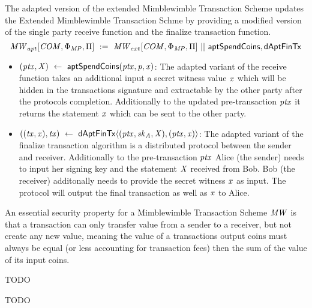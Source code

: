 \begin{definition}
    \label{def:apt-ext-mw-tx-scheme}
    The adapted version of the extended Mimblewimble Transaction Scheme updates the Extended Mimblewimble Transaction Schme by providing a modified version of the single party receive function and the finalize
    transaction function.
    \[ \mathit{MW}_{apt}[\mathit{COM},\Phi_{\mathit{MP}},\Pi] ~:=~ \mathit{MW}_{ext}[\mathit{COM},\Phi_{\mathit{MP}},\Pi] ~||~ \mathsf{aptSpendCoins}, \mathsf{dAptFinTx} \]
    \begin{itemize}
        \item $(\mathit{ptx}, \mathit{X}) ~\leftarrow~ \mathsf{aptSpendCoins}(\mathit{ptx},\mathit{p},\mathit{x})$: The adapted variant of the receive function takes an additional input a secret witness value
        $\mathit{x}$ which will be hidden in the transactions signature and extractable by the other party after the protocols completion. Additionally to the updated pre-transaction $\mathit{ptx}$ it returns
        the statement $\mathit{x}$ which can be sent to the other party.
        \item $((\mathit{tx}, \mathit{x}), \mathit{tx}) ~\leftarrow~ \mathsf{dAptFinTx} \langle (\mathit{ptx},\mathit{sk}_{\mathit{A}},\mathit{X}), (\mathit{ptx},\mathit{x}) \rangle$: The adapted variant of the finalize transaction algorithm is a distributed protocol between the sender
        and receiver. Additionally to the pre-transaction $\mathit{ptx}$ Alice (the sender) needs to input her signing key and the statement $\mathit{X}$ received from Bob. Bob (the receiver) additonally needs
        to provide the secret witness $\mathit{x}$ as input. The protocol will output the final transaction as well as $\mathit{x}$ to Alice.
    \end{itemize}
\end{definition}

An essential security property for a Mimblewimble Transaction Scheme $\mathit{MW}$ is that a transaction can only transfer value from a sender to a receiver, but not create any new value, meaning the value
of a transactions output coins must always be equal (or less accounting for transaction fees) then the sum of the value of its input coins.

\begin{definition}
    TODO
\end{definition}

\begin{definition}
    TODO
\end{definition}

